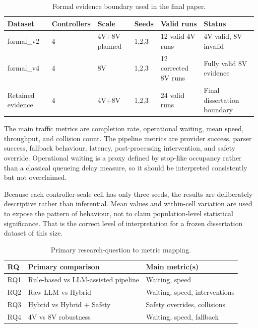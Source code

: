 \documentclass[letterpaper,10pt,conference]{ieeeconf}
\begin{document}
\begin{table}[t]
\centering
\caption{Formal evidence boundary used in the final paper.}
\label{tab:evidence_boundary}
\renewcommand{\arraystretch}{1.08}
\begin{tabular}{p{1.8cm} p{1.6cm} p{1.2cm} p{1.0cm} p{1.35cm} p{1.8cm}}
\toprule
\textbf{Dataset} & \textbf{Controllers} & \textbf{Scale} & \textbf{Seeds} & \textbf{Valid runs} & \textbf{Status} \\
\midrule
formal\_v2 & 4 & 4V+8V planned & 1,2,3 & 12 valid 4V runs & 4V valid, 8V invalid \\
formal\_v4 & 4 & 8V & 1,2,3 & 12 corrected 8V runs & Fully valid 8V evidence \\
Retained evidence & 4 & 4V+8V & 1,2,3 & 24 valid runs & Final dissertation boundary \\
\bottomrule
\end{tabular}
\end{table}

The main traffic metrics are completion rate, operational waiting, mean speed, throughput, and collision count. The pipeline metrics are provider success, parser success, fallback behaviour, latency, post-processing intervention, and safety override. Operational waiting is a proxy defined by stop-like occupancy rather than a classical queueing delay measure, so it should be interpreted consistently but not overclaimed.

Because each controller-scale cell has only three seeds, the results are deliberately descriptive rather than inferential. Mean values and within-cell variation are used to expose the pattern of behaviour, not to claim population-level statistical significance. That is the correct level of interpretation for a frozen dissertation dataset of this size.

\begin{table}[t]
\centering
\caption{Primary research-question to metric mapping.}
\label{tab:rq_metrics}
\renewcommand{\arraystretch}{1.08}
\begin{tabular}{p{0.55cm} p{4.2cm} p{1.7cm}}
\toprule
\textbf{RQ} & \textbf{Primary comparison} & \textbf{Main metric(s)} \\
\midrule
RQ1 & Rule-based vs LLM-assisted pipeline & Waiting, speed \\
RQ2 & Raw LLM vs Hybrid & Waiting, speed, interventions \\
RQ3 & Hybrid vs Hybrid + Safety & Safety overrides, collisions \\
RQ4 & 4V vs 8V robustness & Waiting, speed, fallback \\
\bottomrule
\end{tabular}
\end{table}
\end{document}
